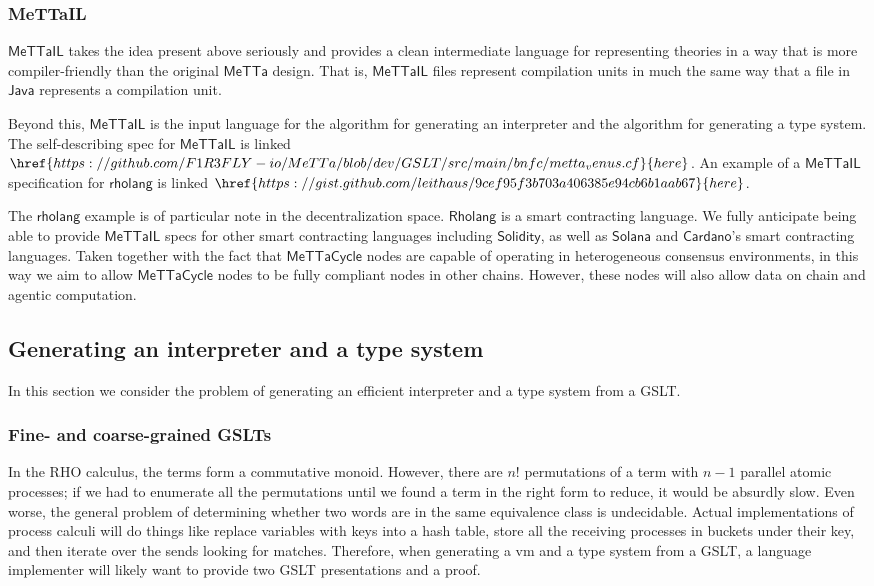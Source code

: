 \documentclass{article}
\newcommand{\MC}{\mathsf{MeTTaCycle}}
\begin{document}
\subsubsection{MeTTaIL}

$\mathsf{MeTTaIL}$ takes the idea present above seriously and provides
a clean intermediate language for representing theories in a way that
is more compiler-friendly than the original $\mathsf{MeTTa}$
design. That is, $\mathsf{MeTTaIL}$ files represent compilation units
in much the same way that a file in $\mathsf{Java}$ represents a
compilation unit.

Beyond this, $\mathsf{MeTTaIL}$ is the input language for the
algorithm for generating an interpreter and the algorithm for
generating a type system. The self-describing spec for
$\mathsf{MeTTaIL}$ is
linked $\href{https://github.com/F1R3FLY-io/MeTTa/blob/dev/GSLT/src/main/bnfc/metta_venus.cf}{here}$. An example of a $\mathsf{MeTTaIL}$ specification for $\mathsf{rholang}$ is linked $\href{https://gist.github.com/leithaus/9cef95f3b703a406385e94cb6b1aab67}{here}$.

The $\mathsf{rholang}$ example is of particular note in the
decentralization space. $\mathsf{Rholang}$ is a smart contracting
language. We fully anticipate being able to provide $\mathsf{MeTTaIL}$
specs for other smart contracting languages including
$\mathsf{Solidity}$, as well as $\mathsf{Solana}$ and
$\mathsf{Cardano}$'s smart contracting languages. Taken together with
the fact that $\MC$ nodes are capable of operating in heterogeneous
consensus environments, in this way we aim to allow $\MC$ nodes to be
fully compliant nodes in other chains. However, these nodes will also
allow data on chain and agentic computation.

\subsection{Generating an interpreter and a type system}
\label{Generating an interpreter and a type system}

In this section we consider the problem of generating an efficient interpreter and a type system from a GSLT.

\subsubsection{Fine- and coarse-grained GSLTs}
In the RHO calculus, the terms form a commutative monoid.  However, there are $n!$ permutations of a term with $n-1$ parallel atomic processes; if we had to enumerate all the permutations until we found a term in the right form to reduce, it would be absurdly slow.  Even worse, the general problem of determining whether two words are in the same equivalence class is undecidable.  Actual implementations of process calculi will do things like replace variables with keys into a hash table, store all the receiving processes in buckets under their key, and then iterate over the sends looking for matches.  Therefore, when generating a vm and a type system from a GSLT, a language implementer will likely want to provide two GSLT presentations and a proof.
\end{document}
